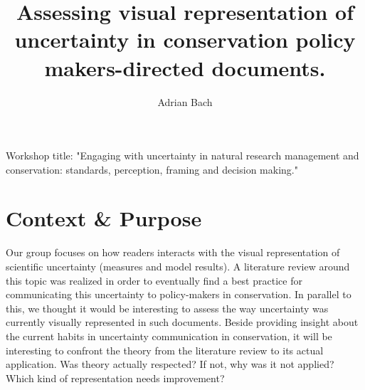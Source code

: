 \documentclass[12pt,a4paper]{article}
\author{Adrian Bach}
\title{Assessing visual representation of uncertainty in conservation policy makers-directed documents.}
\begin{document}
\maketitle

\tableofcontents

Workshop title: "Engaging with uncertainty in natural research management and conservation: standards, perception, framing and decision making."

\section{Context \& Purpose}

Our group focuses on how readers interacts with the visual representation of scientific uncertainty (measures and model results).
A literature review around this topic was realized in order to eventually find a best practice for communicating this uncertainty to policy-makers in conservation.
In parallel to this, we thought it would be interesting to assess the way uncertainty was currently visually represented in such documents.
Beside providing insight about the current habits in uncertainty communication in conservation, it will be interesting to confront the theory from the literature review to its actual application.
Was theory actually respected? If not, why was it not applied? Which kind of representation needs improvement?
\end{document}
